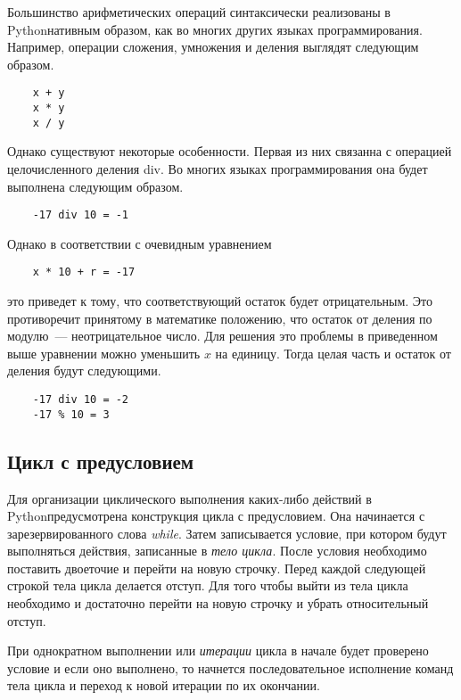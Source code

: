 \documentclass[a4paper, fleqn]{article}
\newcommand*{\py}{Python}
\begin{document}
	Большинство арифметических операций синтаксически реализованы в \py нативным образом, как во многих других языках программирования. Например, операции сложения, умножения и деления выглядят следующим образом.
	\begin{lstlisting}
	x + y
	x * y
	x / y
	\end{lstlisting}
	
	Однако существуют некоторые особенности. Первая из них связанна с операцией целочисленного деления div. Во многих языках программирования она будет выполнена следующим образом.
	\begin{lstlisting}
	-17 div 10 = -1
	\end{lstlisting}
	
	Однако в соответствии с очевидным уравнением
	\begin{lstlisting}
	x * 10 + r = -17
	\end{lstlisting}
	это приведет к тому, что соответствующий остаток будет отрицательным. Это противоречит принятому в математике положению, что остаток от деления по модулю~--- неотрицательное число.
	Для решения это проблемы в приведенном выше уравнении можно уменьшить $x$ на единицу. Тогда целая часть и остаток от деления будут следующими.
	\begin{lstlisting}
	-17 div 10 = -2
	-17 % 10 = 3
	\end{lstlisting}
	
	\subsection*{Цикл с предусловием}
	
	Для организации циклического выполнения каких-либо действий в \py предусмотрена конструкция цикла с предусловием. Она начинается с зарезервированного слова \emph{while}. Затем записывается условие, при котором будут выполняться действия, записанные в \emph{тело цикла}. После условия необходимо поставить двоеточие и перейти на новую строчку.
	Перед каждой следующей строкой тела цикла делается отступ.
	Для того чтобы выйти из тела цикла необходимо и достаточно перейти на новую строчку и убрать относительный отступ.
	
	При однократном выполнении  или \emph{итерации} цикла в начале будет проверено условие и если оно выполнено, то начнется последовательное исполнение команд тела цикла и переход к новой итерации по их окончании. 
	
\end{document}
